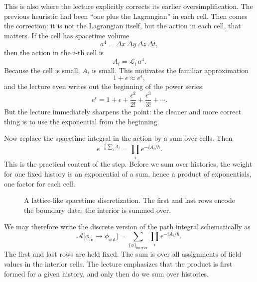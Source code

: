 This is also where the lecture explicitly corrects its earlier oversimplification. The previous heuristic had been ``one plus the Lagrangian'' in each cell. Then comes the correction: it is not the Lagrangian itself, but the action in each cell, that matters. If the cell has spacetime volume
\[
a^4=\Delta x\,\Delta y\,\Delta z\,\Delta t,
\]
then the action in the \(i\)-th cell is
\begin{equation}
A_i=\mathcal{L}_i\,a^4.
\end{equation}
Because the cell is small, \(A_i\) is small. This motivates the familiar approximation
\begin{equation}
1+\epsilon \approx e^\epsilon,
\end{equation}
and the lecture even writes out the beginning of the power series:
\begin{equation}
e^\epsilon=1+\epsilon+\frac{\epsilon^2}{2!}+\frac{\epsilon^3}{3!}+\cdots .
\end{equation}
But the lecture immediately sharpens the point: the cleaner and more correct thing is to use the exponential from the beginning.

Now replace the spacetime integral in the action by a sum over cells. Then
\begin{equation}
e^{-\frac{i}{\hbar}\sum_i A_i}
=
\prod_i e^{-iA_i/\hbar}.
\end{equation}
This is the practical content of the step. Before we sum over histories, the weight for one fixed history is an exponential of a sum, hence a product of exponentials, one factor for each cell.

\begin{figure}[h]
\centering
{}
\caption{A lattice-like spacetime discretization. The first and last rows encode the boundary data; the interior is summed over.}
\end{figure}

We may therefore write the discrete version of the path integral schematically as
\begin{equation}
\mathcal{A}\big[\phi_{\mathrm{in}}\to\phi_{\mathrm{out}}\big]
=
\sum_{\{\phi\}_{\mathrm{interior}}}
\prod_i e^{-iA_i/\hbar}.
\end{equation}
The first and last rows are held fixed. The sum is over all assignments of field values in the interior cells. The lecture emphasizes that the product is first formed for a given history, and only then do we sum over histories.

